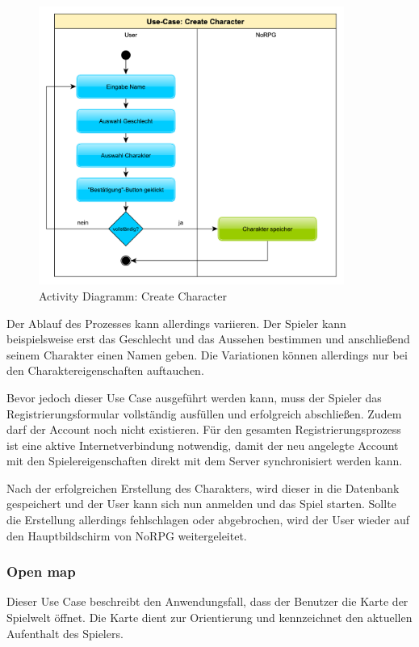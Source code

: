 			\begin{figure}[htbp]
				\centering 
				\label{createCharakter}
				\includegraphics[width=10cm]{pics/CreateCharacter.pdf}
				\caption{Activity Diagramm: Create Character}
			\end{figure}
		
			Der Ablauf des Prozesses kann allerdings variieren. Der Spieler kann beispielsweise erst das Geschlecht und das Aussehen bestimmen und anschließend seinem Charakter einen Namen geben. Die Variationen können allerdings nur bei den Charaktereigenschaften auftauchen.
	
			Bevor jedoch dieser Use Case ausgeführt werden kann, muss der Spieler das Registrierungsformular vollständig ausfüllen und erfolgreich abschließen. Zudem darf der Account noch nicht existieren. Für den gesamten Registrierungsprozess ist eine aktive Internetverbindung notwendig, damit der neu angelegte Account mit den Spielereigenschaften direkt mit dem Server synchronisiert werden kann.
			
			Nach der erfolgreichen Erstellung des Charakters, wird dieser in die Datenbank gespeichert und der User kann sich nun anmelden und das Spiel starten. Sollte die Erstellung allerdings fehlschlagen oder abgebrochen, wird der User wieder auf den Hauptbildschirm von NoRPG weitergeleitet. 
			
		\subsubsection{Open map}
			Dieser Use Case beschreibt den Anwendungsfall, dass der Benutzer die Karte der Spielwelt öffnet. Die Karte dient zur Orientierung und kennzeichnet den aktuellen Aufenthalt des Spielers.
			
